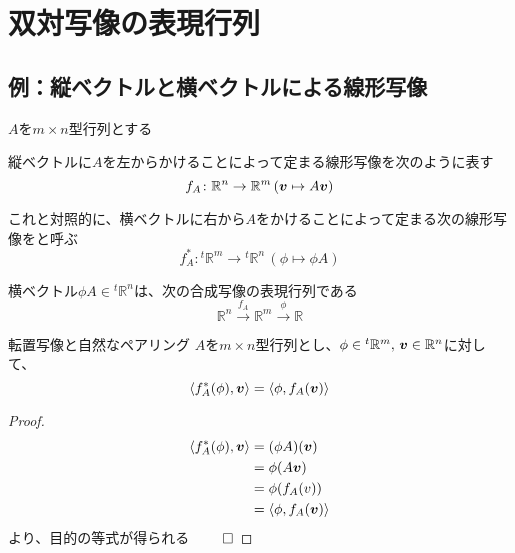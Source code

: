 \documentclass[../../../topic_linear-algebra]{subfiles}
\begin{document}
\sectionline
\section{双対写像の表現行列}

\todo{}

\subsection{例：縦ベクトルと横ベクトルによる線形写像}

$A$を$m \times n$型行列とする

\br

縦ベクトルに$A$を左からかけることによって定まる線形写像を次のように表す
\begin{equation*}
  f_A \colon \mathbb{R}^n \to \mathbb{R}^m \, (\vb*{v} \mapsto A \vb*{v})
\end{equation*}

\br

これと対照的に、横ベクトルに右から$A$をかけることによって定まる次の線形写像をと呼ぶ
\begin{equation*}
  f_A^* \colon {}^t\mathbb{R}^m \to {}^t\mathbb{R}^n \, (\phi \mapsto \phi A)
\end{equation*}

\br

横ベクトル$\phi A \in {}^t\mathbb{R}^n$は、次の合成写像の表現行列である
\begin{equation*}
  \mathbb{R}^n \xrightarrow{f_A} \mathbb{R}^m \xrightarrow{\phi} \mathbb{R}
\end{equation*}

\br

\begin{theorem}{転置写像と自然なペアリング}
  $A$を$m \times n$型行列とし、$\phi \in {}^t\mathbb{R}^m,\,\vb*{v} \in \mathbb{R}^n$に対して、
  \begin{equation*}
    \langle f_A^*(\phi), \vb*{v} \rangle = \langle \phi, f_A(\vb*{v}) \rangle
  \end{equation*}
\end{theorem}

\begin{proof}
  \begin{align*}
    \langle f_A^*(\phi), \vb*{v} \rangle & = (\phi A)(\vb*{v})                  \\
                                         & = \phi(A \vb*{v})                    \\
                                         & = \phi(f_A \vb({v}))                 \\
                                         & = \langle \phi, f_A(\vb*{v}) \rangle
  \end{align*}
  より、目的の等式が得られる $\qed$
\end{proof}
\end{document}

